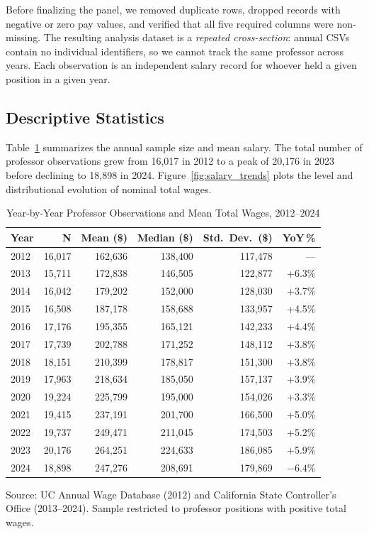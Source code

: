 \documentclass[12pt]{article}
\begin{document}
Before finalizing the panel, we removed duplicate rows, dropped records
with negative or zero pay values, and verified that all five required
columns were non-missing. The resulting analysis dataset is a
\textit{repeated cross-section}: annual CSVs contain no individual
identifiers, so we cannot track the same professor across years. Each
observation is an independent salary record for whoever held a given
position in a given year.

\subsection{Descriptive Statistics}

Table~\ref{tab:trends} summarizes the annual sample size and mean salary.
The total number of professor observations grew from 16,017 in 2012 to a
peak of 20,176 in 2023 before declining to 18,898 in 2024.
Figure~\ref{fig:salary_trends} plots the level and distributional
evolution of nominal total wages.

\begin{table}[H]
\centering
\caption{Year-by-Year Professor Observations and Mean Total Wages, 2012--2024}
\label{tab:trends}
\begin{tabular}{lrrrrr}
\toprule
Year & N & Mean (\$) & Median (\$) & Std.\ Dev.\ (\$) & YoY\,\% \\
\midrule
2012 & 16,017 & 162,636 & 138,400 & 117,478 & --- \\
2013 & 15,711 & 172,838 & 146,505 & 122,877 & +6.3\% \\
2014 & 16,042 & 179,202 & 152,000 & 128,030 & +3.7\% \\
2015 & 16,508 & 187,178 & 158,688 & 133,957 & +4.5\% \\
2016 & 17,176 & 195,355 & 165,121 & 142,233 & +4.4\% \\
2017 & 17,739 & 202,788 & 171,252 & 148,112 & +3.8\% \\
2018 & 18,151 & 210,399 & 178,817 & 151,300 & +3.8\% \\
2019 & 17,963 & 218,634 & 185,050 & 157,137 & +3.9\% \\
2020 & 19,224 & 225,799 & 195,000 & 154,026 & +3.3\% \\
2021 & 19,415 & 237,191 & 201,700 & 166,500 & +5.0\% \\
2022 & 19,737 & 249,471 & 211,045 & 174,503 & +5.2\% \\
2023 & 20,176 & 264,251 & 224,633 & 186,085 & +5.9\% \\
2024 & 18,898 & 247,276 & 208,691 & 179,869 & $-6.4$\% \\
\bottomrule
\end{tabular}
\begin{flushleft}
\small Source: UC Annual Wage Database (2012) and California State
Controller's Office (2013--2024). Sample restricted to professor
positions with positive total wages.
\end{flushleft}
\end{table}
\end{document}
